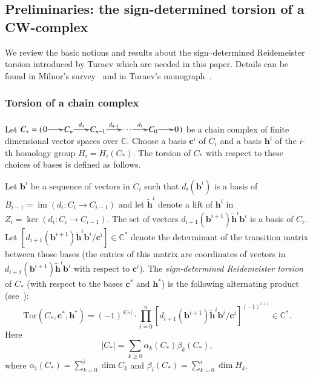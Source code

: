 \documentclass[a4paper]{amsart}
\theoremstyle{plain}
\theoremstyle{definition}
\theoremstyle{remark}
\newcommand{\im}{\mathop{\mathrm{im}}\nolimits}
\begin{document}
\subsection{Preliminaries: the sign-determined torsion of a CW-complex}

We review the basic notions and results about the sign--determined Reidemeister torsion introduced by Turaev which are needed in this paper. Details can be found in Milnor's survey~\cite{Milnor:1966} and in Turaev's monograph~\cite{Turaev:2002}.

\subsubsection*{Torsion of a chain complex}
Let $C_* = (\xymatrix@1@-.5pc{0 \ar[r] & C_n \ar[r]^-{d_n} & C_{n-1} \ar[r]^-{d_{n-1}} & \cdots \ar[r]^-{d_1} & C_0 \ar[r] & 0})$ be a chain complex of finite dimensional vector spaces over $\mathbb{C}$. Choose  a basis $\mathbf{c}^i$ of $C_i$ and  a basis $\mathbf{h}^i$ of the $i$-th homology group $H_i = H_i(C_*)$. The torsion of $C_*$ with respect to these choices of bases is defined as follows.

Let $\mathbf{b}^i$ be a sequence of vectors in $C_{i}$ such that $d_{i}(\mathbf{b}^i)$ is a basis of $B_{i-1}= \im(d_{i} \colon C_{i} \to C_{i-1})$ and let $\widetilde{\mathbf{h}}^i$ denote a lift of $\mathbf{h}^i$ in $Z_i = \ker(d_{i} \colon C_i \to C_{i-1})$. The set of vectors $d_{i+1}(\mathbf{b}^{i+1})\widetilde{\mathbf{h}}^i\mathbf{b}^i$ is a basis of $C_i$. Let $[d_{i+1}(\mathbf{b}^{i+1})\widetilde{\mathbf{h}}^i\mathbf{b}^i/\mathbf{c}^i] \in \mathbb{C}^*$ denote the determinant of the transition matrix between those bases (the entries of this matrix are coordinates of vectors in $d_{i+1}(\mathbf{b}^{i+1})\widetilde{\mathbf{h}}^i\mathbf{b}^i$ with respect to $\mathbf{c}^i$). The \emph{sign-determined Reidemeister torsion} of $C_*$ (with respect to the bases $\mathbf{c}^*$ and $\mathbf{h}^*$) is the following alternating product (see~\cite[Definition 3.1]{Turaev:2000}):
\begin{equation}
\label{Def:RTorsion}
\mathrm{Tor}(C_*, \mathbf{c}^*, \mathbf{h}^*) = (-1)^{|C_*|} \cdot  \prod_{i=0}^n [d_{i+1}(\mathbf{b}^{i+1})\widetilde{\mathbf{h}}^i\mathbf{b}^i/\mathbf{c}^i]^{(-1)^{i+1}} \in \mathbb{C}^*.
\end{equation}
Here  $$|C_*| = \sum_{k\geqslant 0} \alpha_k(C_*) \beta_k(C_*),$$ where $\alpha_i(C_*) = \sum_{k=0}^i \dim C_k$ and  $\beta_i(C_*)  = \sum_{k=0}^i \dim H_k$.
\end{document}
